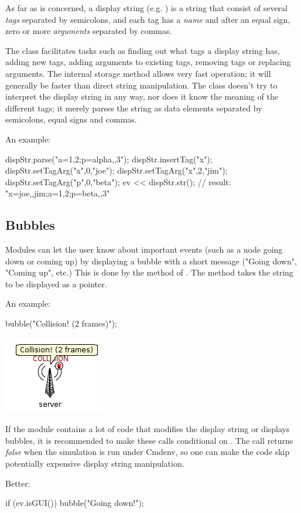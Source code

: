 As far as  is concerned, a display string
(e.g. ) is a string that consist of several
\textit{tags} separated by semicolons, and each tag has a \textit{name}
and after an equal sign, zero or more \textit{arguments} separated by commas.

The class facilitates tasks such as finding out what tags a display string
has, adding new tags, adding arguments to existing tags,
removing tags or replacing arguments. The internal storage method allows
very fast operation; it will generally be faster than direct string manipulation.
The class doesn't try to interpret the display string in any way, nor does
it know the meaning of the different tags; it merely parses the string
as data elements separated by semicolons, equal signs and commas.

An example:

\begin{cpp}
dispStr.parse("a=1,2;p=alpha,,3");
dispStr.insertTag("x");
dispStr.setTagArg("x",0,"joe");
dispStr.setTagArg("x",2,"jim");
dispStr.setTagArg("p",0,"beta");
ev << dispStr.str();  // result: "x=joe,,jim;a=1,2;p=beta,,3"
\end{cpp}

\subsection{Bubbles}

Modules can let the user know about important events (such as a node
going down or coming up) by displaying a bubble with a short message
("Going down", "Coming up", etc.) This is done by the  method
of . The method takes the string to be displayed
as a  pointer.

An example:
\begin{cpp}
bubble("Collision! (2 frames)");
\end{cpp}

\begin{center}
\includegraphics{figures/graphics-bubble}
\end{center}

If the module contains a lot of code that modifies the display string or
displays bubbles, it is recommended to make these calls conditional
on . The  call returns \textit{false}
when the simulation is run under Cmdenv, so one can make the code skip
potentially expensive display string manipulation.

Better:
\begin{cpp}
if (ev.isGUI())
    bubble("Going down!");
\end{cpp}


